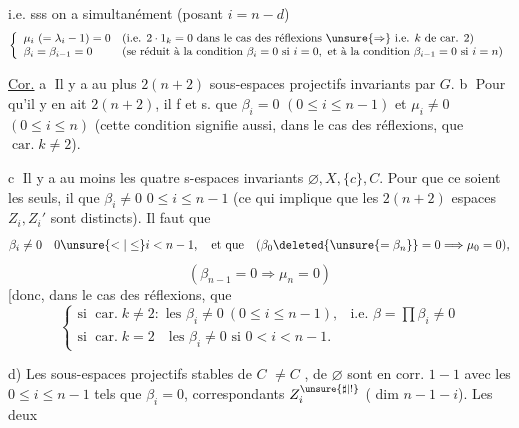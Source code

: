 
i.e. sss on a simultanément (posant $i=n-d$)
\[
\left\{
\begin{array}{ll}
\mu_i\ (= \lambda_i-1)=0&
\text{(i.e. }2\cdot1_k=0\text{ dans le cas des réflexions }\unsure{\Rightarrow}\text{ i.e. }k\text{ de car. }2)\\
\beta_i=\beta_{i-1}=0&
\text{(se réduit à la condition }\beta_i=0\text{ si }i=0,\text{ et à la condition }\beta_{i-1}=0\text{ si }i=n)
\end{array}\right.
\]


\uline{Cor.} \textcircled{a} Il y a au plus $2(n+2)$ sous-espaces projectifs invariants par $G$. \textcircled{b} Pour qu'il y en ait $2(n+2)$, il f et s. que $\beta_i=0$ $(0\leq i\leq n-1)$ et $\mu_i\neq0$  $(0\leq i\leq n)$ (cette condition signifie aussi, dans le cas des réflexions, que $\operatorname{car.}k\neq2$).

\textcircled{c}  Il y a au moins les quatre s-espaces invariants $\varnothing,X,\{c\},C$. Pour que ce soient les seuls, il   que $\beta_i\neq0$ $0\leq i\leq n-1$ (ce qui implique que les $2(n+2)$ espaces $Z_i,Z_i'$ sont distincts). Il faut  que
\[
\beta_i\neq0\quad0\unsure{<|\leq}i<n-1,
\quad\text{et que}\quad
(\beta_0\deleted{\unsure{=\beta_n}}=0\Longrightarrow\mu_0=0),
\]
\[
(\beta_{n-1}=0\Longrightarrow\mu_n=0)
\]
[donc, dans le cas des réflexions, que
\[
\left\{
\begin{array}{ll}
\text{si }\operatorname{car.}k\neq2:\text{ les }\beta_i\neq0\ (0\leq i\leq n-1),
&\text{i.e. }\beta=\prod\beta_i\neq0\\
\text{si }\operatorname{car.}k=2\quad\text{les }\beta_i\neq0\text{ si }0<i<n-1.&
\end{array}
\right.
\]



d) Les sous-espaces projectifs stables de $C$ $\neq C$ , de $\varnothing$  sont en corr. $1-1$ avec les $0\leq i\leq n-1$ tels que $\beta_i=0$,   correspondants $Z_i^{\unsure{\sharp|!}}$ ( dim $n-1-i$). Les deux


